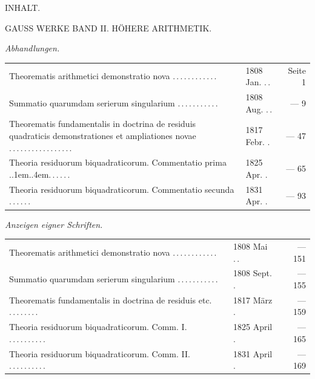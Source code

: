 \clearpage
\renewcommand{\BookRunningTitle}{Inhalt.}
\begin{center}\Large INHALT.\par\medskip
\large GAUSS WERKE BAND II. HÖHERE ARITHMETIK.
\end{center}
\par\medskip{}\textit{Abhandlungen.}
\begingroup\fontsize{10}{13}\selectfont
\begin{longtable}{@{}p{.60\linewidth}@{\quad}p{.24\linewidth}@{\quad}r@{}}
Theorematis arithmetici demonstratio nova .\,.\,.\,.\,.\,.\,.\,.\,.\,.\,.\,. & 1808 Jan. .\,. & Seite 1 \\[3pt]
Summatio quarumdam serierum singularium .\,.\,.\,.\,.\,.\,.\,.\,.\,.\,. & 1808 Aug. .\,. & — 9 \\[3pt]
Theorematis fundamentalis in doctrina de residuis quadraticis demonstrationes et ampliationes novae .\,.\,.\,.\,.\,.\,.\,.\,.\,.\,.\,.\,.\,.\,.\,.\,. & 1817 Febr. . & — 47 \\[3pt]
Theoria residuorum biquadraticorum. Commentatio prima .\kern.1em.\kern.4em.\,.\,.\,.\,.\,. & 1825 Apr. . & — 65 \\[3pt]
Theoria residuorum biquadraticorum. Commentatio secunda .\,.\,.\,.\,.\,. & 1831 Apr. . & — 93 \\[3pt]
\end{longtable}\endgroup
\par\medskip{}\textit{Anzeigen eigner Schriften.}
\begingroup\fontsize{10}{13}\selectfont
\begin{longtable}{@{}p{.60\linewidth}@{\quad}p{.24\linewidth}@{\quad}r@{}}
Theorematis arithmetici demonstratio nova .\,.\,.\,.\,.\,.\,.\,.\,.\,.\,.\,. & 1808 Mai .\,. & — 151 \\[3pt]
Summatio quarumdam serierum singularium .\,.\,.\,.\,.\,.\,.\,.\,.\,.\,. & 1808 Sept. . & — 155 \\[3pt]
Theorematis fundamentalis in doctrina de residuis etc. .\,.\,.\,.\,.\,.\,.\,. & 1817 März . & — 159 \\[3pt]
Theoria residuorum biquadraticorum. Comm. I. .\,.\,.\,.\,.\,.\,.\,.\,.\,. & 1825 April . & — 165 \\[3pt]
Theoria residuorum biquadraticorum. Comm. II. .\,.\,.\,.\,.\,.\,.\,.\,.\,. & 1831 April . & — 169 \\[3pt]
\end{longtable}\endgroup

